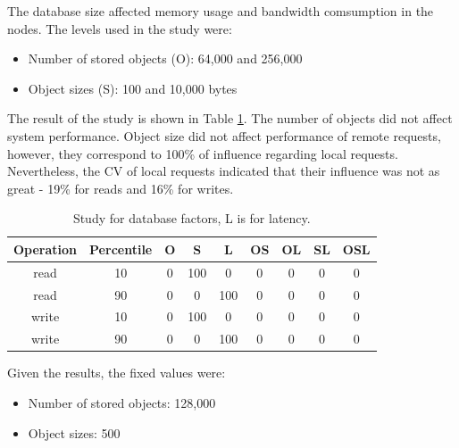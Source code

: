 \documentclass[doublespacing]{bmcart}
\begin{document}
The database size affected memory
usage and bandwidth comsumption in the nodes. The levels used in the study were:

\begin{itemize}

\item Number of stored objects (O): 64,000 and 256,000

\item Object sizes (S): 100 and 10,000 bytes

\end{itemize}

The result of the study is shown in Table
\ref{tab:estudo_para_fatores_de_banco_de_dados}. The number of objects did not
affect system performance. Object size did not affect performance of remote
requests, however, they correspond to 100\% of influence regarding local
requests. Nevertheless, the CV of local requests indicated that their influence
was not as great - 19\% for reads and 16\% for writes.

\begin{table}[h!]
\caption{Study for database factors, L is for latency.}
\begin{tabular}{ccccccccc} \hline

Operation & Percentile & O & S & L & OS & OL & SL & OSL\\\hline

read & 10 & 0 & 100 & 0 & 0 & 0 & 0 & 0 \\

read & 90 & 0 & 0 & 100 & 0 & 0 & 0 & 0 \\

write & 10 & 0 & 100 & 0 & 0 & 0 & 0 & 0 \\

write & 90 & 0 & 0 & 100 & 0 & 0 & 0 & 0 \\\hline

\end{tabular}
\label{tab:estudo_para_fatores_de_banco_de_dados} \end{table}

Given the results, the fixed values were:

\begin{itemize}

\item Number of stored objects: 128,000

\item Object sizes: 500

\end{itemize}
\end{document}
